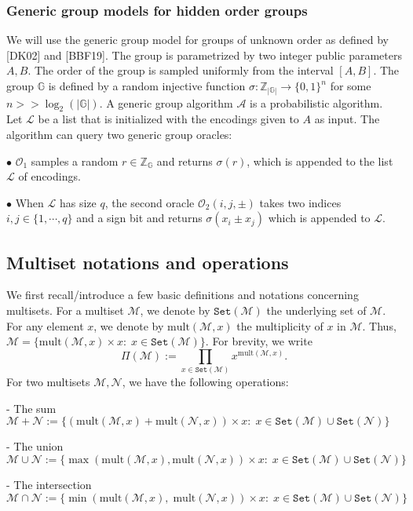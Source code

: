 \documentclass[11pt, lettersize, notitlepage, leqno, footskip=0.6cm]{article}
\newcommand{\bz}{\mathbb Z}
\newcommand{\pl}{\prod\limits}
\newcommand{\ttt}{\texttt}
\newcommand{\bG}{\mathbb{G}}
\newcommand{\sett}{\ttt{Set}}
\newcommand{\mult}{\mr{mult}}
\newcommand{\mul}{\mr{mult}}
\newcommand{\lra}{\longrightarrow}
\newcommand{\mc}{\mathcal}
\newcommand{\mr}{\mathrm}
\newcommand{\vs}{\vspace{-0.15cm}}
\newcommand{\noin}{\noindent}
\numberwithin{equation}{section}
\begin{document}
\subsubsection{\fontsize{11}{11}\selectfont Generic group models for hidden order groups}

We will use the generic group model for groups of unknown order as defined by [DK02] and [BBF19]. The group is parametrized by two integer public parameters $A, B$. The order of the group is sampled uniformly from  the interval $[A, B]$. The group $\bG$ is defined by a random injective function $\sigma: \bz_{|\bG|}\lra \{0, 1 \}^n$ for some $n>>\log_2(|\bG|)$. A generic group algorithm $\mc{A}$ is a probabilistic algorithm. Let $\mc{L}$ be a list that is initialized with the encodings given to $A$ as input. The algorithm can query two generic group oracles:

\noin $\bullet$ $\mc{O}_1$ samples a random $r\in \bz_{\bG}$ and returns $\sigma(r)$, which is appended to the list $\mc{L}$ of encodings.

\noin $\bullet$ When $\mc{L}$ has size $q$, the second oracle $\mc{O}_2(i,j,\pm)$ takes two indices $i, j\in\{1,\cdots,q \}$ and a sign bit and returns $\sigma(x_i\pm x_j)$ which is appended to $\mc{L}$.


\subsection{\fontsize{11}{11}\selectfont Multiset notations and operations}


We first recall/introduce a few basic definitions and notations concerning multisets. For a multiset $\mc{M}$, we denote by $\sett(\mc{M})$ the underlying set of $\mc{M}$. For any element $x$, we denote by $\mul(\mc{M},x)$ the multiplicity of $x$ in $\mc{M}$. Thus, $\mc{M} = \{ \mult(\mc{M},x)\times x: \; x\in \sett(\mc{M})\}$. For brevity, we write \vs $$\Pi(\mc{M}):= \pl_{x\in \sett(\mc{M})} x^{\mult(\mc{M},x)}.$$ For two multisets $\mc{M}, \mc{N}$, we have the following operations:\vspace{0.1cm}

\noin - The sum $\mc{M}+\mc{N} := \{(\mul(\mc{M},x)+\mul(\mc{N},x))\times x:\;x\in \sett(\mc{M})\cup\sett(\mc{N}) \}$

\noin - The union $\mc{M}\cup \mc{N} := \{\max(\mul(\mc{M},x),\mul(\mc{N},x))\times x:\;x\in \sett(\mc{M})\cup\sett(\mc{N})\}$

\noin - The intersection $\mc{M}\cap \mc{N} := \{\min(\mul(\mc{M},x),\;\mul(\mc{N},x))\times x:\;x\in \sett(\mc{M})\cup\sett(\mc{N})\}$
\end{document}
